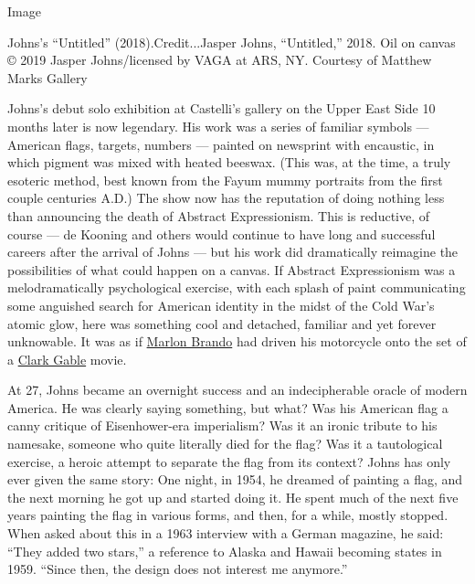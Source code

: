 Image

Johns's ``Untitled'' (2018).Credit...Jasper Johns, ``Untitled,'' 2018.
Oil on canvas © 2019 Jasper Johns/licensed by VAGA at ARS, NY. Courtesy
of Matthew Marks Gallery

Johns's debut solo exhibition at Castelli's gallery on the Upper East
Side 10 months later is now legendary. His work was a series of familiar
symbols --- American flags, targets, numbers --- painted on newsprint
with encaustic, in which pigment was mixed with heated beeswax. (This
was, at the time, a truly esoteric method, best known from the Fayum
mummy portraits from the first couple centuries A.D.) The show now has
the reputation of doing nothing less than announcing the death of
Abstract Expressionism. This is reductive, of course --- de Kooning and
others would continue to have long and successful careers after the
arrival of Johns --- but his work did dramatically reimagine the
possibilities of what could happen on a canvas. If Abstract
Expressionism was a melodramatically psychological exercise, with each
splash of paint communicating some anguished search for American
identity in the midst of the Cold War's atomic glow, here was something
cool and detached, familiar and yet forever unknowable. It was as if
\href{https://www.nytimes.com/2004/07/02/movies/marlon-brando-oscarwinning-actor-is-dead-at-80.html}{Marlon
Brando} had driven his motorcycle onto the set of a
\href{https://www.nytimes.com/1960/11/17/archives/clark-gable-dies-in-hollywood-of-heart-ailment-at-age-of-59-king-of.html}{Clark
Gable} movie.

At 27, Johns became an overnight success and an indecipherable oracle of
modern America. He was clearly saying something, but what? Was his
American flag a canny critique of Eisenhower-era imperialism? Was it an
ironic tribute to his namesake, someone who quite literally died for the
flag? Was it a tautological exercise, a heroic attempt to separate the
flag from its context? Johns has only ever given the same story: One
night, in 1954, he dreamed of painting a flag, and the next morning he
got up and started doing it. He spent much of the next five years
painting the flag in various forms, and then, for a while, mostly
stopped. When asked about this in a 1963 interview with a German
magazine, he said: ``They added two stars,'' a reference to Alaska and
Hawaii becoming states in 1959. ``Since then, the design does not
interest me anymore.''

